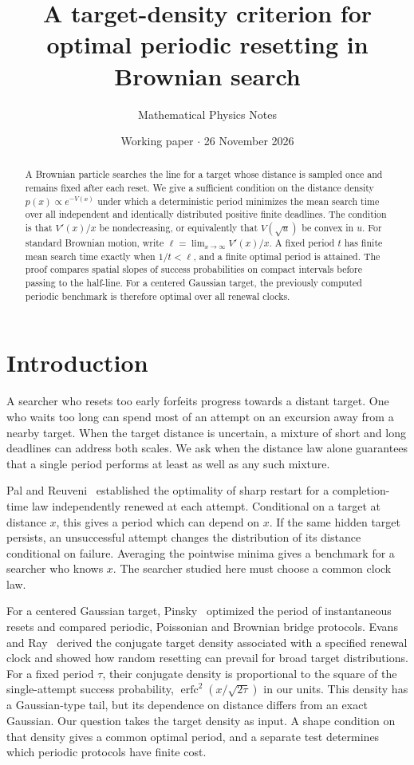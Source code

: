 \documentclass[11pt]{article}
\title{A target-density criterion for optimal periodic resetting in Brownian search}
\author{Mathematical Physics Notes}
\date{Working paper \(\cdot\) 26 November 2026}
\newcommand{\erfc}{\operatorname{erfc}}
\begin{document}
\maketitle
\begin{abstract}
A Brownian particle searches the line for a target whose distance is sampled
once and remains fixed after each reset. We give a sufficient condition on
the distance density $p(x)\propto e^{-V(x)}$ under which a deterministic
period minimizes the mean search time over all independent and identically
distributed positive finite deadlines. The condition is that $V'(x)/x$ be
nondecreasing, or equivalently that $V(\sqrt{u})$ be convex in $u$.
For standard Brownian motion, write $\ell=\lim_{x\to\infty}V'(x)/x$.
A fixed period $t$ has finite mean search time exactly when $1/t<\ell$,
and a finite optimal period is attained. The proof compares spatial slopes
of success probabilities on compact intervals before passing to the
half-line. For a centered Gaussian target, the previously computed
periodic benchmark is therefore optimal over all renewal clocks.
\end{abstract}

\section{Introduction}
A searcher who resets too early forfeits progress towards a distant target.
One who waits too long can spend most of an attempt on an excursion away
from a nearby target. When the target distance is uncertain, a mixture of
short and long deadlines can address both scales. We ask when the distance
law alone guarantees that a single period performs at least as well as any
such mixture.

Pal and Reuveni~\cite{pal} established the optimality of sharp restart for
a completion-time law independently renewed at each attempt. Conditional
on a target at distance $x$, this gives a period which can depend on $x$.
If the same hidden target persists, an unsuccessful attempt changes the
distribution of its distance conditional on failure. Averaging the
pointwise minima gives a benchmark for a searcher who knows $x$.
The searcher studied here must choose a common clock law.

For a centered Gaussian target, Pinsky~\cite[Theorem~3]{pinsky} optimized
the period of instantaneous resets and compared periodic, Poissonian and
Brownian bridge protocols. Evans and Ray~\cite{evans} derived the conjugate
target density associated with a specified renewal clock and showed how
random resetting can prevail for broad target distributions. For a fixed
period $\tau$, their conjugate density is proportional to the square of
the single-attempt success probability, $\erfc^2(x/\sqrt{2\tau})$ in
our units. This density has a Gaussian-type tail, but its dependence on
distance differs from an exact Gaussian. Our question takes the target
density as input. A shape condition on that density gives a common optimal
period, and a separate test determines which periodic protocols have finite cost.
\end{document}
